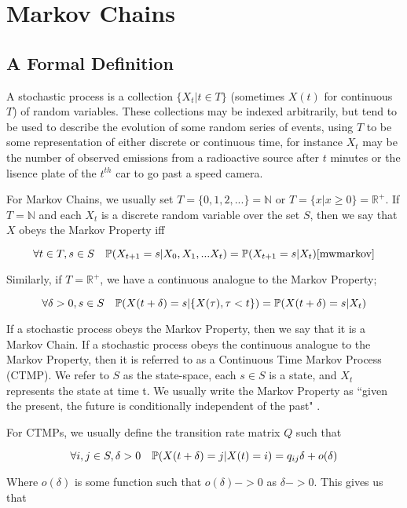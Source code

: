 \section{Markov Chains}

\subsection{A Formal Definition}

A stochastic process \cite[p590]{doob96} is a collection $\{X_t  | t \in T\}$ (sometimes $X(t)$ for continuous $T$) of random variables. These collections may be indexed arbitrarily, but tend to be used to describe the evolution of some random series of events, using $T$ to be some representation of either discrete or continuous time, for instance $X_t$ may be the number of observed emissions from a radioactive source after $t$ minutes or the lisence plate of the $t^{th}$ car to go past a speed camera.

For Markov Chains, we usually set $T=\{0,1,2,...\}=\mathbb{N}$ or $T =\{x | x \geqslant 0 \} = \mathbb{R}^{+}$. If $T=\mathbb{N}$ and each $X_t$ is a discrete random variable over the set $S$, then we say that $X$ obeys the Markov Property iff

$$
\forall t \in T, s \in S \quad \mathbb{P} (X_{t+1} = s | X_0, X_1, ... X_t) = \mathbb{P} (X_{t+1} = s | X_t)\cite{mwmarkov}
$$

Similarly, if $T=\mathbb{R}^{+}$, we have a continuous analogue to the Markov Property;

$$
\forall \delta > 0, s \in S \quad \mathbb{P} (X(t+\delta) = s | \{X(\tau), \tau < t\}) = \mathbb{P} (X(t+\delta) = s | X_t)
$$

If a stochastic process obeys the Markov Property, then we say that it is a Markov Chain. If a stochastic process obeys the continuous analogue to the Markov Property, then it is referred to as a Continuous Time Markov Process (CTMP). We refer to $S$ as the state-space, each $s \in S$ is a state, and $X_t$ represents the state at time t. We usually write the Markov Property as ``given the present, the future is conditionally independent of the past" \cite{mwmarkov}.

For CTMPs, we usually define the transition rate matrix $Q$ such that

$$
\forall i,j \in S, \delta>0 \quad \mathbb{P} (X(t+\delta)=j|X(t)=i) = q_{ij}\delta + o(\delta)
$$

Where $o(\delta)$ is some function such that $o(\delta) -> 0$ as $\delta -> 0$. This gives us that

